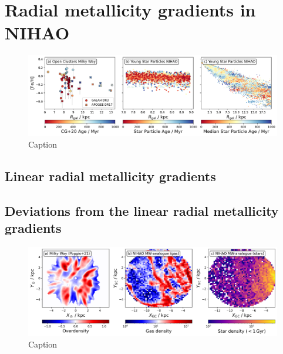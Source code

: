 \documentclass[fleqn,usenatbib]{mnras}
\begin{document}
%     



\section{Radial metallicity gradients in NIHAO}
\label{sec:radial_metallicity_gradients}

\begin{figure}
    \centering
    \includegraphics[width=\textwidth]{figures/radial_metallicity_gradients_mw_vs_nihao.png}
    \caption{Caption}
    \label{fig:enter-label}
\end{figure}



\subsection{Linear radial metallicity gradients}
\label{sec:linear_radial_metallicity_gradients}

\subsection{Deviations from the linear radial metallicity gradients}
\label{sec:deviations_radial_metallicity_gradients}

\begin{figure}
    \centering
    \includegraphics[width=\textwidth]{figures/overdensities_mw_vs_nihao.png}
    \caption{Caption}
    \label{fig:enter-label}
\end{figure}
\end{document}
